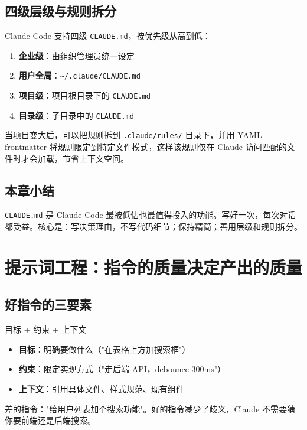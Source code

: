 \documentclass[a4paper]{article}
\begin{document}
\subsection{四级层级与规则拆分}

Claude Code 支持四级 \texttt{CLAUDE.md}，按优先级从高到低：

\begin{enumerate}[leftmargin=1.5em]
  \item \textbf{企业级}：由组织管理员统一设定
  \item \textbf{用户全局}：\texttt{\textasciitilde/.claude/CLAUDE.md}
  \item \textbf{项目级}：项目根目录下的 \texttt{CLAUDE.md}
  \item \textbf{目录级}：子目录中的 \texttt{CLAUDE.md}
\end{enumerate}

当项目变大后，可以把规则拆到 \texttt{.claude/rules/} 目录下，并用 YAML frontmatter 将规则限定到特定文件模式，这样该规则仅在 Claude 访问匹配的文件时才会加载，节省上下文空间。

\subsection{本章小结}

\texttt{CLAUDE.md} 是 Claude Code 最被低估也最值得投入的功能。写好一次，每次对话都受益。核心是：写决策理由，不写代码细节；保持精简；善用层级和规则拆分。

\section{提示词工程：指令的质量决定产出的质量}

\subsection{好指令的三要素}

\begin{importantbox}{目标 + 约束 + 上下文}
\begin{itemize}[leftmargin=1.5em]
  \item \textbf{目标}：明确要做什么（"在表格上方加搜索框"）
  \item \textbf{约束}：限定实现方式（"走后端 API，debounce 300ms"）
  \item \textbf{上下文}：引用具体文件、样式规范、现有组件
\end{itemize}
差的指令："给用户列表加个搜索功能"。好的指令减少了歧义，Claude 不需要猜你要前端还是后端搜索。
\end{importantbox}
\end{document}
